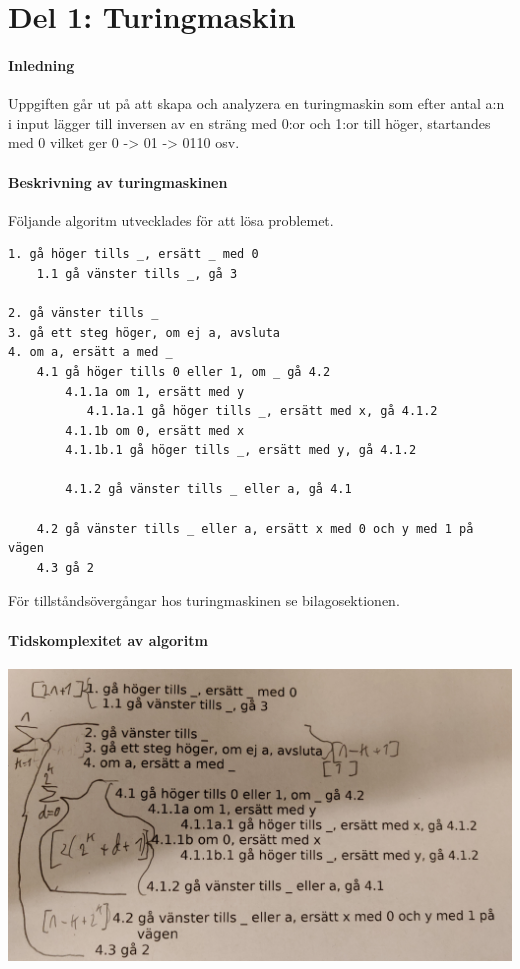 \section{Del 1: Turingmaskin}
\paragraph{Inledning}    
Uppgiften går ut på att skapa och analyzera en turingmaskin som efter antal a:n i input lägger till inversen av en sträng med 0:or och 1:or till höger, startandes med 0 vilket ger 0 -> 01 -> 0110 osv.

\paragraph{Beskrivning av turingmaskinen}
Följande algoritm utvecklades för att lösa problemet.
\begin{verbatim}
1. gå höger tills _, ersätt _ med 0 
    1.1 gå vänster tills _, gå 3

2. gå vänster tills _
3. gå ett steg höger, om ej a, avsluta 
4. om a, ersätt a med _ 
    4.1 gå höger tills 0 eller 1, om _ gå 4.2 
        4.1.1a om 1, ersätt med y   
           4.1.1a.1 gå höger tills _, ersätt med x, gå 4.1.2  
        4.1.1b om 0, ersätt med x 
        4.1.1b.1 gå höger tills _, ersätt med y, gå 4.1.2 

        4.1.2 gå vänster tills _ eller a, gå 4.1  
    
    4.2 gå vänster tills _ eller a, ersätt x med 0 och y med 1 på vägen 
    4.3 gå 2
\end{verbatim}
För tillståndsövergångar hos turingmaskinen se bilagosektionen.

\paragraph{Tidskomplexitet av algoritm}

\begin{center}
    \includegraphics[width=\linewidth]{bilder/komplexitet_analys.jpg}
\end{center}


